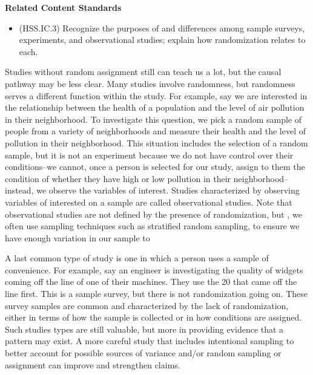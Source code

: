 \documentclass[
]{book}
\providecommand{\tightlist}{%
  \setlength{\itemsep}{0pt}\setlength{\parskip}{0pt}}
\newenvironment{standards}{}{}
\theoremstyle{definition}
\theoremstyle{definition}
\theoremstyle{definition}
\theoremstyle{definition}
\theoremstyle{remark}
\begin{document}
\begin{standards}

\begin{center}
\textbf{Related Content Standards}

\end{center}

\begin{itemize}
\tightlist
\item
  (HSS.IC.3) Recognize the purposes of and differences among sample surveys, experiments, and observational studies; explain how randomization relates to each.
\end{itemize}

\end{standards}

Studies without random assignment still can teach us a lot, but the causal pathway may be less clear. Many studies involve randomness, but randomness serves a different function within the study. For example, say we are interested in the relationship between the health of a population and the level of air pollution in their neighborhood. To investigate this question, we pick a random sample of people from a variety of neighborhoods and measure their health and the level of pollution in their neighborhood. This situation includes the selection of a random sample, but it is not an experiment because we do not have control over their conditions--we cannot, once a person is selected for our study, assign to them the condition of whether they have high or low pollution in their neighborhood--instead, we observe the variables of interest. Studies characterized by observing variables of interested on a sample are called observational studies. Note that observational studies are not defined by the presence of randomization, but , we often use sampling techniques such as stratified random sampling, to ensure we have enough variation in our sample to

A last common type of study is one in which a person uses a sample of convenience. For example, say an engineer is investigating the quality of widgets coming off the line of one of their machines. They use the 20 that came off the line first. This is a sample survey, but there is not randomization going on. These survey samples are common and characterized by the lack of randomization, either in terms of how the sample is collected or in how conditions are assigned. Such studies types are still valuable, but more in providing evidence that a pattern may exist. A more careful study that includes intentional sampling to better account for possible sources of variance and/or random sampling or assignment can improve and strengthen claims.
\end{document}
